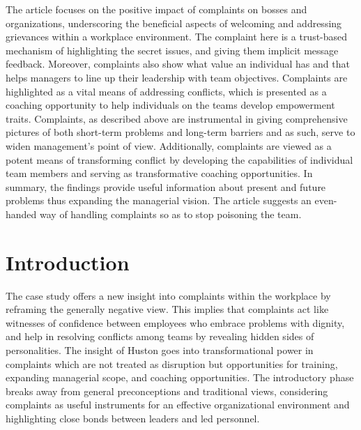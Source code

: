 \documentclass[a4paper,12pt]{report}
\begin{document}
The article focuses on the positive impact of complaints on bosses and organizations, underscoring the beneficial aspects of welcoming and addressing grievances within a workplace environment. The complaint here is a trust-based mechanism of highlighting the secret issues, and giving them implicit message feedback. Moreover, complaints also show what value an individual has and that helps managers to line up their leadership with team objectives. Complaints are highlighted as a vital means of addressing conflicts, which is presented as a coaching opportunity to help individuals on the teams develop empowerment traits. Complaints, as described above are instrumental in giving comprehensive pictures of both short-term problems and long-term barriers and as such, serve to widen management's point of view. Additionally, complaints are viewed as a potent means of transforming conflict by developing the capabilities of individual team members and serving as transformative coaching opportunities. In summary, the findings provide useful information about present and future problems thus expanding the managerial vision. The article suggests an even-handed way of handling complaints so as to stop poisoning the team.

\chapter{Introduction}
The case study offers a new insight into complaints within the workplace by reframing the generally negative view. This implies that complaints act like witnesses of confidence between employees who embrace problems with dignity, and help in resolving conflicts among teams by revealing hidden sides of personalities. The insight of Huston goes into transformational power in complaints which are not treated as disruption but opportunities for training, expanding managerial scope, and coaching opportunities. The introductory phase breaks away from general preconceptions and traditional views, considering complaints as useful instruments for an effective organizational environment and highlighting close bonds between leaders and led personnel.
\end{document}
